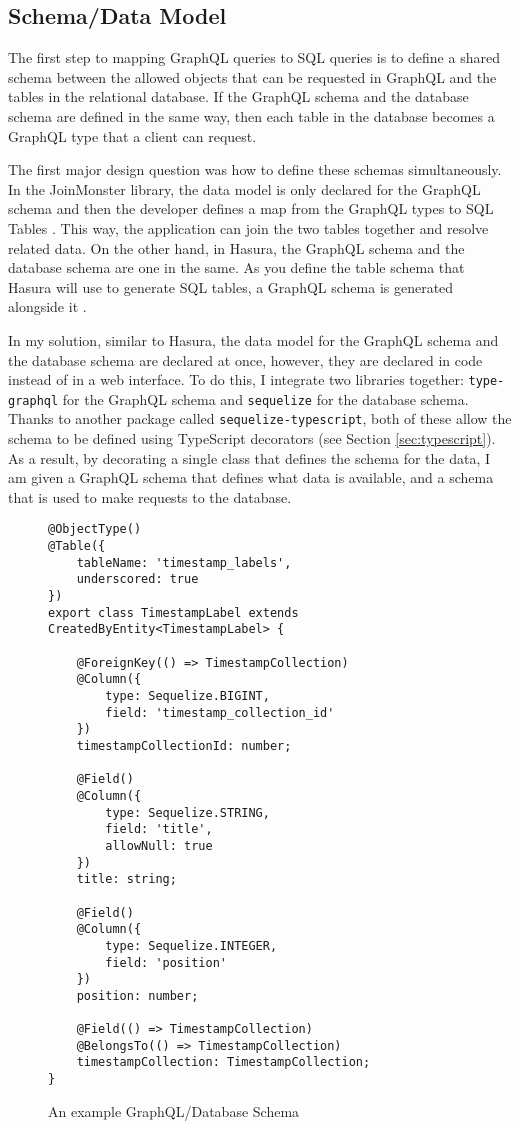 \subsection{Schema/Data Model}\label{sec:schema}

The first step to mapping GraphQL queries to SQL queries is to define a shared schema between the allowed objects that can be requested in GraphQL and the tables in the relational database.  If the GraphQL schema and the database schema are defined in the same way, then each table in the database becomes a GraphQL type that a client can request.

The first major design question was how to define these schemas simultaneously.  In the JoinMonster library, the data model is only declared for the GraphQL schema and then the developer defines a map from the GraphQL types to SQL Tables \cite{carlJoinMonster}.  This way, the application can join the two tables together and resolve related data.  On the other hand, in Hasura, the GraphQL schema and the database schema are one in the same.  As you define the table schema that Hasura will use to generate SQL tables, a GraphQL schema is generated alongside it \cite{hasurainc.HasuraGraphQLEngine}.

In my solution, similar to Hasura, the data model for the GraphQL schema and the database schema are declared at once, however, they are declared in code instead of in a web interface.  To do this, I integrate two libraries together: \Verb!type-graphql! for the GraphQL schema and \Verb!sequelize! for the database schema.  Thanks to another package called \Verb!sequelize-typescript!, both of these allow the schema to be defined using TypeScript decorators (see Section \ref{sec:typescript}).  As a result, by decorating a single class that defines the schema for the data, I am given a GraphQL schema that defines what data is available, and a schema that is used to make requests to the database.

\begin{figure}
    \begin{verbatim}
@ObjectType()
@Table({
    tableName: 'timestamp_labels',
    underscored: true
})
export class TimestampLabel extends CreatedByEntity<TimestampLabel> {

    @ForeignKey(() => TimestampCollection)
    @Column({
        type: Sequelize.BIGINT,
        field: 'timestamp_collection_id'
    })
    timestampCollectionId: number;

    @Field()
    @Column({
        type: Sequelize.STRING,
        field: 'title',
        allowNull: true
    })
    title: string;

    @Field()
    @Column({
        type: Sequelize.INTEGER,
        field: 'position'
    })
    position: number;

    @Field(() => TimestampCollection)
    @BelongsTo(() => TimestampCollection)
    timestampCollection: TimestampCollection;
}
    \end{verbatim}
    \caption{An example GraphQL/Database Schema}
    \label{fig:example-entity}
\end{figure}

